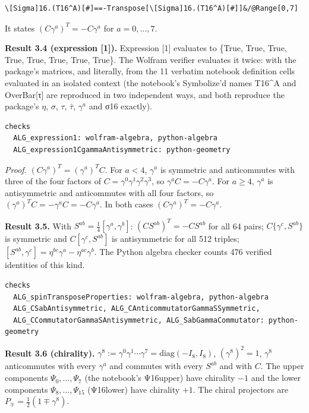 \documentclass[11pt]{article}
\begin{document}
\begin{Verbatim}[fontsize=\small]
\[Sigma]16.(T16^A)[#]==-Transpose[\[Sigma]16.(T16^A)[#]]&/@Range[0,7]
\end{Verbatim}

It states $(C\gamma^a)^T=-C\gamma^a$ for $a=0,\dots,7$.

\textbf{Result 3.4 (expression [1]).} Expression [1] evaluates to \{True, True, True, True, True, True, True, True\}. The Wolfram verifier evaluates it twice: with the package's matrices, and literally, from the 11 verbatim notebook definition cells evaluated in an isolated context (the notebook's Symbolize'd names T16\textasciicircum{}A and OverBar[τ] are reproduced in two independent ways, and both reproduce the package's $\eta$, $\sigma$, $\tau$, $\bar\tau$, $\gamma^a$ and σ16 exactly).

\begin{Verbatim}[fontsize=\small]
checks
  ALG_expression1: wolfram-algebra, python-algebra
  ALG_expression1CgammaAntisymmetric: python-geometry
\end{Verbatim}

\emph{Proof.} $(C\gamma^a)^T=(\gamma^a)^TC$. For $a<4$, $\gamma^a$ is symmetric and anticommutes with three of the four factors of $C=\gamma^0\gamma^1\gamma^2\gamma^3$, so $\gamma^aC=-C\gamma^a$. For $a\ge4$, $\gamma^a$ is antisymmetric and anticommutes with all four factors, so $(\gamma^a)^TC=-\gamma^aC=-C\gamma^a$. In both cases $(C\gamma^a)^T=-C\gamma^a$.

\textbf{Result 3.5.} With $S^{ab}=\tfrac14[\gamma^a,\gamma^b]$: $(CS^{ab})^T=-CS^{ab}$ for all 64 pairs; $C\{\gamma^c,S^{ab}\}$ is symmetric and $C[\gamma^c,S^{ab}]$ is antisymmetric for all 512 triples; $[S^{ab},\gamma^c]=\eta^{bc}\gamma^a-\eta^{ac}\gamma^b$. The Python algebra checker counts 476 verified identities of this kind.

\begin{Verbatim}[fontsize=\small]
checks
  ALG_spinTransposeProperties: wolfram-algebra, python-algebra
  ALG_CSabAntisymmetric, ALG_CAnticommutatorGammaSSymmetric,
  ALG_CCommutatorGammaSAntisymmetric, ALG_SabGammaCommutator: python-geometry
\end{Verbatim}

\textbf{Result 3.6 (chirality).} $\gamma^8:=\gamma^0\gamma^1\cdots\gamma^7=\mathrm{diag}(-I_8,I_8)$, $(\gamma^8)^2=1$, $\gamma^8$ anticommutes with every $\gamma^a$ and commutes with every $S^{ab}$ and with $C$. The upper components $\Psi_0,\dots,\Psi_7$ (the notebook's Ψ16upper) have chirality $-1$ and the lower components $\Psi_8,\dots,\Psi_{15}$ (Ψ16lower) have chirality $+1$. The chiral projectors are $P_\mp=\tfrac12(1\mp\gamma^8)$.
\end{document}
